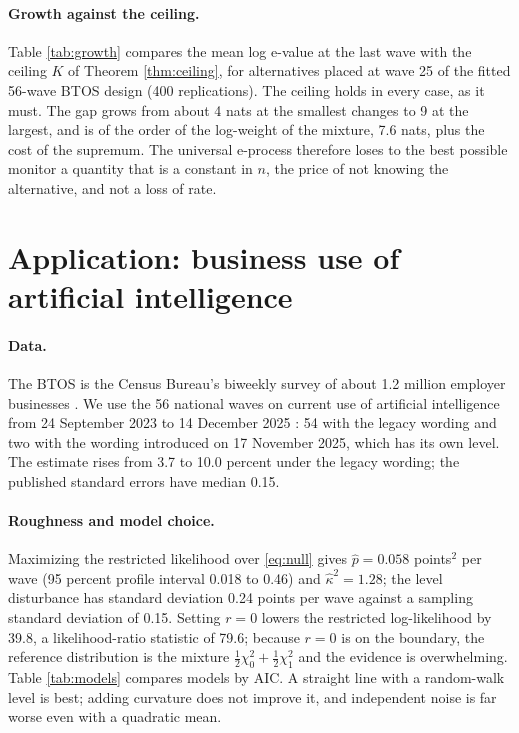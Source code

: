 \documentclass[11pt]{article}
\theoremstyle{plain}
\theoremstyle{definition}
\begin{document}
\paragraph{Growth against the ceiling.} Table \ref{tab:growth} compares the mean log e-value at the last wave with the ceiling $K$ of Theorem \ref{thm:ceiling}, for alternatives placed at wave 25 of the fitted 56-wave BTOS design (400 replications). The ceiling holds in every case, as it must. The gap grows from about 4 nats at the smallest changes to 9 at the largest, and is of the order of the log-weight of the mixture, 7.6 nats, plus the cost of the supremum. The universal e-process therefore loses to the best possible monitor a quantity that is a constant in $n$, the price of not knowing the alternative, and not a loss of rate.

\begin{table}[t]
\centering\small
\caption{Mean log e-value at wave 56 of the exact-scale e-process against the ceiling $K$ of Theorem \ref{thm:ceiling}, on the fitted BTOS design with change at wave 25 (nats).}
\label{tab:growth}

\end{table}

\section{Application: business use of artificial intelligence}
\label{sec:application}

\paragraph{Data.} The BTOS is the Census Bureau's biweekly survey of about 1.2 million employer businesses \citep{censusmethod2025}. We use the 56 national waves on current use of artificial intelligence from 24 September 2023 to 14 December 2025 \citep{bonney2024}: 54 with the legacy wording and two with the wording introduced on 17 November 2025, which has its own level. The estimate rises from 3.7 to 10.0 percent under the legacy wording; the published standard errors have median 0.15.

\paragraph{Roughness and model choice.} Maximizing the restricted likelihood over \eqref{eq:null} gives $\hat p = 0.058$ points$^2$ per wave (95 percent profile interval 0.018 to 0.46) and $\hat\kappa^2 = 1.28$; the level disturbance has standard deviation 0.24 points per wave against a sampling standard deviation of 0.15. Setting $r=0$ lowers the restricted log-likelihood by 39.8, a likelihood-ratio statistic of 79.6; because $r=0$ is on the boundary, the reference distribution is the mixture $\tfrac12\chi^2_0+\tfrac12\chi^2_1$ \citep{self1987} and the evidence is overwhelming. Table \ref{tab:models} compares models by AIC. A straight line with a random-walk level is best; adding curvature does not improve it, and independent noise is far worse even with a quadratic mean.
\end{document}
